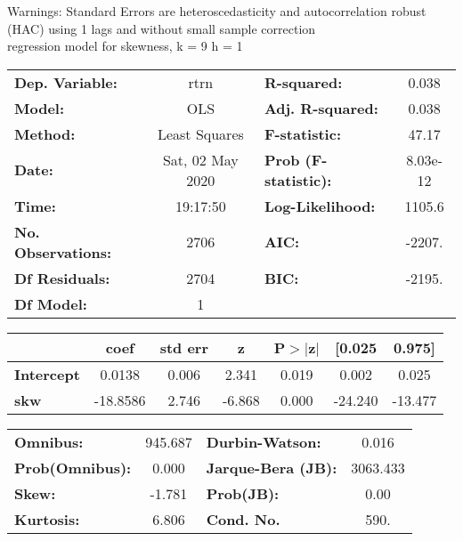 Warnings: \newline
 [1] Standard Errors are heteroscedasticity and autocorrelation robust (HAC) using 1 lags and without small sample correction\\ 

regression model for skewness, k = 9 h = 1\begin{center}
\begin{tabular}{lclc}
\toprule
\textbf{Dep. Variable:}    &       rtrn       & \textbf{  R-squared:         } &     0.038   \\
\textbf{Model:}            &       OLS        & \textbf{  Adj. R-squared:    } &     0.038   \\
\textbf{Method:}           &  Least Squares   & \textbf{  F-statistic:       } &     47.17   \\
\textbf{Date:}             & Sat, 02 May 2020 & \textbf{  Prob (F-statistic):} &  8.03e-12   \\
\textbf{Time:}             &     19:17:50     & \textbf{  Log-Likelihood:    } &    1105.6   \\
\textbf{No. Observations:} &        2706      & \textbf{  AIC:               } &    -2207.   \\
\textbf{Df Residuals:}     &        2704      & \textbf{  BIC:               } &    -2195.   \\
\textbf{Df Model:}         &           1      & \textbf{                     } &             \\
\bottomrule
\end{tabular}
\begin{tabular}{lcccccc}
                   & \textbf{coef} & \textbf{std err} & \textbf{z} & \textbf{P$> |$z$|$} & \textbf{[0.025} & \textbf{0.975]}  \\
\midrule
\textbf{Intercept} &       0.0138  &        0.006     &     2.341  &         0.019        &        0.002    &        0.025     \\
\textbf{skw}       &     -18.8586  &        2.746     &    -6.868  &         0.000        &      -24.240    &      -13.477     \\
\bottomrule
\end{tabular}
\begin{tabular}{lclc}
\textbf{Omnibus:}       & 945.687 & \textbf{  Durbin-Watson:     } &    0.016  \\
\textbf{Prob(Omnibus):} &   0.000 & \textbf{  Jarque-Bera (JB):  } & 3063.433  \\
\textbf{Skew:}          &  -1.781 & \textbf{  Prob(JB):          } &     0.00  \\
\textbf{Kurtosis:}      &   6.806 & \textbf{  Cond. No.          } &     590.  \\
\bottomrule
\end{tabular}
\end{center}

